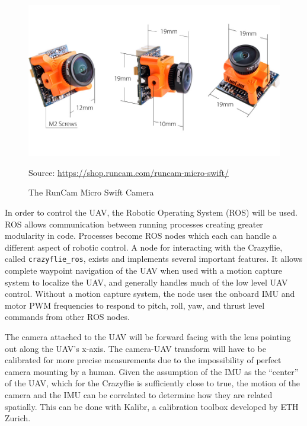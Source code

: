 \documentclass[12pt]{article}
\begin{document}
\begin{figure}
	\centering
	\includegraphics[scale=0.3]{micro-swift-size}
	\caption[The RunCam Micro Swift Camera]{The RunCam Micro Swift Camera}
	\vspace{8pt}
	\small Source: \url{https://shop.runcam.com/runcam-micro-swift/}
	\label{crazyflie_cam}
\end{figure}

In order to control the UAV, the Robotic Operating System (ROS) will be used. ROS allows communication between running processes creating greater modularity in code. Processes become ROS nodes which each can handle a different aspect of robotic control. A node for interacting with the Crazyflie, called \verb|crazyflie_ros|\cite{crazyflie_ros}, exists and implements several important features. It allows complete waypoint navigation of the UAV when used with a motion capture system to localize the UAV, and generally handles much of the low level UAV control. Without a motion capture system, the node uses the onboard IMU and motor PWM frequencies to respond to pitch, roll, yaw, and thrust level commands from other ROS nodes.

The camera attached to the UAV will be forward facing with the lens pointing out along the UAV's x-axis. The camera-UAV transform will have to be calibrated for more precise measurements due to the impossibility of perfect camera mounting by a human. Given the assumption of the IMU as the ``center'' of the UAV, which for the Crazyflie is sufficiently close to true, the motion of the camera and the IMU can be correlated to determine how they are related spatially. This can be done with Kalibr\cite{Kalibr}, a calibration toolbox developed by ETH Zurich.
\end{document}
